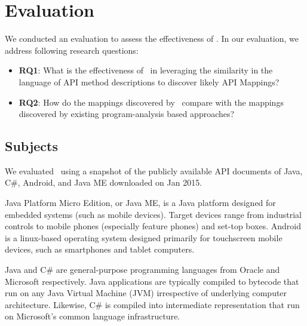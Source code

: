 \section{Evaluation}
\label{sec:evaluation}

We conducted an evaluation to assess the effectiveness of \tool. In our evaluation, we address following research questions:

\begin{itemize}
	
\item\textbf{RQ1}: What is the effectiveness of \tool\ in leveraging the similarity in the language of API method descriptions to discover likely API Mappings?

\item\textbf{RQ2}: How do the mappings discovered by \tool\ compare with the mappings discovered by existing program-analysis based approaches?


\end{itemize}

\subsection{Subjects}
\label{sub:subject}


We evaluated \tool\ using a snapshot of the publicly available API documents of Java, C\#, Android, and Java ME downloaded on Jan 2015. 

Java Platform Micro Edition, or Java ME, is a Java platform designed for embedded systems (such as mobile devices). Target devices range from industrial controls to mobile phones (especially feature phones) and set-top boxes.
Android is a linux-based operating system designed primarily for touchscreen mobile devices, such as smartphones and tablet computers.

Java and C\# are general-purpose programming languages from Oracle and Microsoft respectively. Java applications are typically compiled to bytecode that run on any Java Virtual Machine (JVM) irrespective of underlying computer architecture.
Likewise, C\# is compiled into intermediate representation that run on Microsoft's common language infrastructure.


